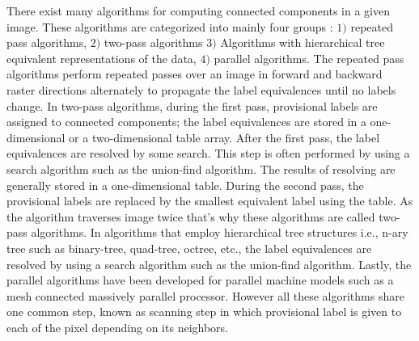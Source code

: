 There exist many algorithms for computing connected components in a given image. These algorithms are categorized into
mainly four groups %
\cite{Suzuki2003_Linear}
: $1)$ repeated pass
algorithms\cite{Haralick1981_Repeated,Hashizume1990_Algorithm}, $2)$ two-pass
algorithms\cite{gotoh1990high,gotoh1987component,komeichi1989video,lumia1983new,lumia1983new_c,naoi1995high,rosenfeld1970connectivity,
rosenfeld1966sequential,shirai1987labeling}
$3)$ Algorithms with hierarchical tree equivalent representations of the
data\cite{dillencourt1992general,gargantini1982separation,hecquard1991connected,samet1981connected,samet1985computing,samet1988efficient,
samet1986improved,tamminen1984efficient},
$4)$ parallel
algorithms\cite{bhattacharya1996connected,choudhary1994connected,
hirschberg1979computing,manohar1989connected,nassimi1980finding,olariu1993fast}.
The repeated pass algorithms perform repeated passes over an image in forward and backward raster directions alternately
to propagate the label equivalences until no labels change.
In two-pass algorithms, during the first pass, provisional labels are assigned to connected components;
the label equivalences are stored in a one-dimensional or a two-dimensional table array. After the first pass, the label 
equivalences are resolved by some search. This step is often performed by using
a search algorithm such as the union-find algorithm.
The results of resolving are generally stored in a one-dimensional table. During the second pass, the provisional labels are 
replaced by the smallest equivalent label using the table. As the algorithm traverses image twice that's why these algorithms 
are called two-pass algorithms.
In algorithms that employ hierarchical tree structures i.e., n-ary tree such as binary-tree, quad-tree, octree, etc., the
label equivalences are resolved by using a search algorithm such as the union-find algorithm.
Lastly, the parallel algorithms have been developed for parallel machine models such as a mesh connected massively parallel processor.
However all these algorithms share one common step, known as scanning step in
which provisional label is given to each of the pixel depending on its neighbors.

